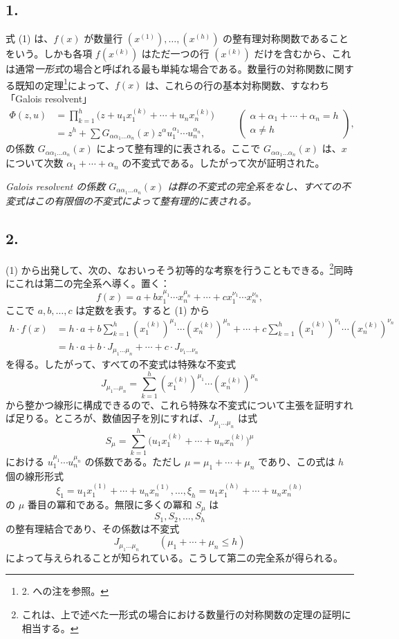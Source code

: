 \documentclass[11pt]{article}
\begin{document}
\subsection*{1.}
式 (1) は、$f(x)$ が数量行 $(x^{(1)}),
\ldots,(x^{(h)})$ の整有理対称関数であることをいう。しかも各項 $f(x^{(k)})$ はただ一つの行 $(x^{(k)})$ だけを含むから、これは通常\emph{一形式}の場合と呼ばれる最も単純な場合である。数量行の対称関数に関する既知の定理\footnote{2. への注を参照。}によって、$f(x)$ は、これらの行の基本対称関数、すなわち「Galois resolvent」
\[
\begin{aligned}
  \Phi(z,u)
  &=\prod_{k=1}^{h}\bigl(z+u_1x_1^{(k)}+\cdots+u_nx_n^{(k)}\bigr) \\
  &=z^h+
    \sum G_{\alpha\alpha_1\ldots\alpha_n}(x)
    z^{\alpha}u_1^{\alpha_1}\cdots u_n^{\alpha_n},
\end{aligned}
\qquad
\left(\begin{array}{c}
\alpha+\alpha_1+
\cdots+
\alpha_n=h\\
\alpha\ne h
\end{array}\right),
\]
の係数 $G_{\alpha\alpha_1\ldots\alpha_n}(x)$ によって整有理的に表される。ここで $G_{\alpha\alpha_1\ldots\alpha_n}(x)$ は、$x$ について次数 $\alpha_1+\cdots+\alpha_n$ の不変式である。したがって次が証明された。

\emph{Galois resolvent の係数 $G_{\alpha\alpha_1\ldots\alpha_n}(x)$ は群の不変式の完全系をなし、すべての不変式はこの有限個の不変式によって整有理的に表される。}

\subsection*{2.}
(1) から出発して、次の、なおいっそう初等的な考察を行うこともできる。\footnote{これは、上で述べた一形式の場合における数量行の対称関数の定理の証明に相当する。}同時にこれは第二の完全系へ導く。置く：
\[
  f(x)=a+b x_1^{\mu_1}\cdots x_n^{\mu_n}
       +\cdots+c x_1^{\nu_1}\cdots x_n^{\nu_n},
\]
ここで $a,b,\ldots,c$ は定数を表す。すると (1) から
\[
\begin{aligned}
 h\cdot f(x)
 &=h\cdot a+b\sum_{k=1}^{h}(x_1^{(k)})^{\mu_1}\cdots(x_n^{(k)})^{\mu_n}
     +\cdots
     +c\sum_{k=1}^{h}(x_1^{(k)})^{\nu_1}\cdots(x_n^{(k)})^{\nu_n} \\
 &=h\cdot a+b\cdot J_{\mu_1\ldots\mu_n}+\cdots+c\cdot J_{\nu_1\ldots\nu_n}
\end{aligned}
\]
を得る。したがって、すべての不変式は特殊な不変式
\[
  J_{\mu_1\ldots\mu_n}
  =\sum_{k=1}^{h}(x_1^{(k)})^{\mu_1}\cdots(x_n^{(k)})^{\mu_n}
\]
から整かつ線形に構成できるので、これら特殊な不変式について主張を証明すれば足りる。ところが、数値因子を別にすれば、$J_{\mu_1\ldots\mu_n}$ は式
\[
  S_\mu=\sum_{k=1}^{h}
  \bigl(u_1x_1^{(k)}+\cdots+u_nx_n^{(k)}\bigr)^{\mu}
\]
における $u_1^{\mu_1}
\cdots u_n^{\mu_n}$ の係数である。ただし $\mu=\mu_1+\cdots+\mu_n$ であり、この式は $h$ 個の線形形式
\[
  \xi_1=u_1x_1^{(1)}+\cdots+u_nx_n^{(1)},\ldots,
  \xi_h=u_1x_1^{(h)}+\cdots+u_nx_n^{(h)}
\]
の $\mu$ 番目の冪和である。無限に多くの冪和 $S_\mu$ は
\[
  S_1,S_2,\ldots,S_h
\]
の整有理結合であり、その係数は不変式
\[
  J_{\mu_1\ldots\mu_n}\qquad(\mu_1+\cdots+\mu_n\le h)
\]
によって与えられることが知られている。こうして第二の完全系が得られる。
\end{document}
